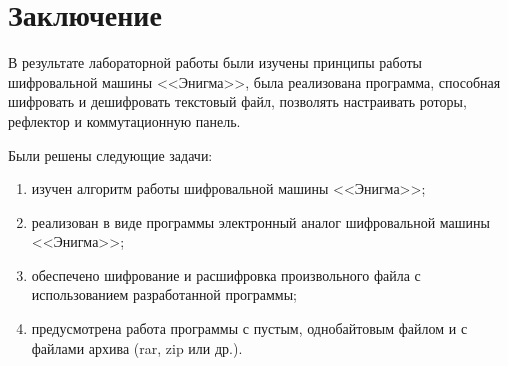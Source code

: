 \chapter*{Заключение}

В результате лабораторной работы были изучены принципы работы шифровальной машины <<Энигма>>, была реализована программа, способная шифровать и дешифровать текстовый файл, позволять настраивать роторы, рефлектор и коммутационную панель. 

Были решены следующие задачи:

\begin{enumerate}[label=\arabic*)]
    \item изучен алгоритм работы шифровальной машины <<Энигма>>;
    \item реализован в виде программы электронный аналог шифровальной машины <<Энигма>>;
    \item обеспечено шифрование и расшифровка произвольного файла с использованием разработанной программы;
    \item предусмотрена работа программы с пустым, однобайтовым файлом и с файлами архива (rar, zip или др.).
\end{enumerate}
